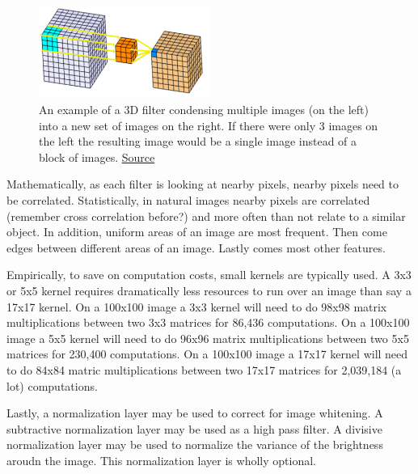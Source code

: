 \documentclass{article}
\begin{document}
\vspace{3mm}

\begin{figure}[ht!]
  \centering
      \includegraphics[width=0.5\textwidth]{3DConv.png}
          \caption{
            An example of a 3D filter condensing multiple images (on the left) into a new set of images on the right.
            If there were only 3 images on the left the resulting image would be a single image instead of a block of images.
            \href{https://www.kaggle.com/shivamb/3d-convolutions-understanding-use-case}{Source}
          }
\end{figure}



\noindent Mathematically, as each filter is looking at nearby pixels, nearby pixels need to be correlated.
Statistically, in natural images nearby pixels are correlated (remember cross correlation before?) and more often than not relate to a similar object.
In addition, uniform areas of an image are most frequent.
Then come edges between different areas of an image.
Lastly comes most other features.

\vspace{3mm}

\noindent Empirically, to save on computation costs, small kernels are typically used.
A 3x3 or 5x5 kernel requires dramatically less resources to run over an image than say a 17x17 kernel.
On a 100x100 image a 3x3 kernel will need to do 98x98 matrix multiplications between two 3x3 matrices for 86,436 computations.
On a 100x100 image a 5x5 kernel will need to do 96x96 matrix multiplications between two 5x5 matrices for 230,400 computations.
On a 100x100 image a 17x17 kernel will need to do 84x84 matric multiplications between two 17x17 matrices for 2,039,184 (a lot) computations.

\vspace{3mm}

\noindent Lastly, a normalization layer may be used to correct for image whitening.
A subtractive normalization layer may be used as a high pass filter.
A divisive normalization layer may be used to normalize the variance of the brightness aroudn the image.
This normalization layer is wholly optional.
\end{document}
